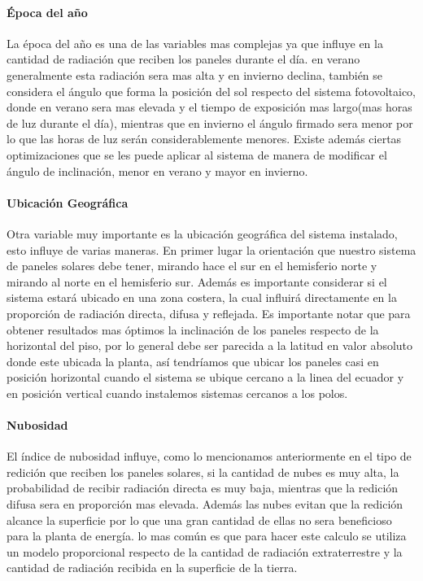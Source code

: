 \paragraph{Época del año}
La época del año es una de las variables mas complejas ya que influye en la cantidad de radiación que reciben los paneles durante el día. en verano generalmente esta radiación sera mas alta y en invierno declina, también se considera el ángulo que forma la posición del sol respecto del sistema fotovoltaico, donde en verano sera mas elevada y el tiempo de exposición mas largo(mas horas de luz durante el día), mientras que en invierno el ángulo firmado sera menor por lo que las horas de luz serán considerablemente menores. Existe además ciertas optimizaciones que se les puede aplicar al sistema de manera de modificar el ángulo de inclinación, menor en verano y mayor en invierno.

\paragraph{Ubicación Geográfica}
Otra variable muy importante es la ubicación geográfica del sistema instalado, esto influye de varias maneras. En primer lugar la orientación que nuestro sistema de paneles solares debe tener, mirando hace el sur en el hemisferio norte y mirando al norte en el hemisferio sur. Además es importante considerar si el sistema estará ubicado en una zona costera, la cual influirá directamente en la proporción de radiación directa, difusa y reflejada. Es importante notar que para obtener resultados mas óptimos la inclinación de los paneles respecto de la horizontal del piso, por lo general debe ser parecida a la latitud en valor absoluto donde este ubicada la planta, así tendríamos que ubicar los paneles casi en posición horizontal cuando el sistema se ubique cercano a la linea del ecuador y en posición vertical cuando instalemos sistemas cercanos a los polos.

\paragraph{Nubosidad}
El índice de nubosidad influye, como lo mencionamos anteriormente en el tipo de redición que reciben los paneles solares, si la cantidad de nubes es muy alta, la probabilidad de recibir radiación directa es muy baja, mientras que la redición difusa sera en proporción mas elevada. Además las nubes evitan que la redición alcance la superficie por lo que una gran cantidad de ellas no sera beneficioso para la planta de energía. lo mas común es que para hacer este calculo se utiliza un modelo proporcional respecto de la cantidad de radiación extraterrestre y la cantidad de radiación recibida en la superficie de la tierra.

